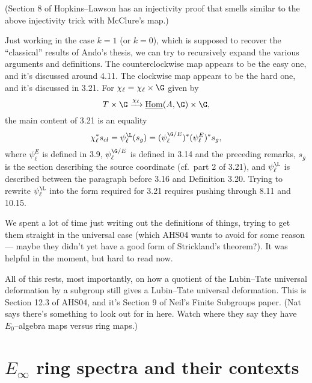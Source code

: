 (Section 8 of Hopkins--Lawson has an injectivity proof that smells similar to the above injectivity trick with McClure's map.)

Just working in the case $k = 1$ (or $k = 0$), which is supposed to recover the ``classical'' results of Ando's thesis, we can try to recursively expand the various arguments and definitions.  The counterclockwise map appears to be the easy one, and it's discussed around 4.11.  The clockwise map appears to be the hard one, and it's discussed in 3.21.  For $\chi_\ell = \chi_\ell \times \G$ given by \[T \times \G \xrightarrow{\chi_\ell} \underline{\operatorname{Hom}}(A, \G) \times \G,\] the main content of 3.21 is an equality \[\chi_\ell^* s_{cl} = \psi_\ell^{\L}(s_g) = (\psi_\ell^{\G/E})^* (\psi_\ell^E)^* s_g,\] where $\psi_\ell^E$ is defined in 3.9, $\psi_\ell^{\G/E}$ is defined in 3.14 and the preceding remarks, $s_g$ is the section describing the source coordinate (cf.\ part 2 of 3.21), and $\psi_\ell^{\L}$ is described between the paragraph before 3.16 and Definition 3.20.  Trying to rewrite $\psi_\ell^{\L}$ into the form required for 3.21 requires pushing through 8.11 and 10.15.

We spent a lot of time just writing out the definitions of things, trying to get them straight in the universal case (which AHS04 wants to avoid for some reason --- maybe they didn't yet have a good form of Strickland's theorem?).  It was helpful in the moment, but hard to read now.

All of this rests, most importantly, on how a quotient of the Lubin--Tate universal deformation by a subgroup still gives a Lubin--Tate universal deformation.  This is Section 12.3 of AHS04, and it's Section 9 of Neil's Finite Subgroups paper.  (Nat says there's something to look out for in here.  Watch where they say they have $E_0$--algebra maps versus ring maps.)






\section{\texorpdfstring{$E_\infty$}{Eoo} ring spectra and their contexts}

